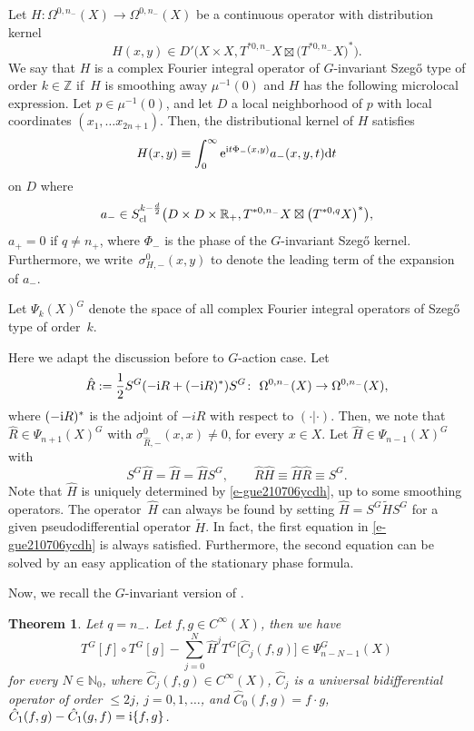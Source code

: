 \documentclass[10pt,a4paper]{amsart}
\numberwithin{equation}{section}
\newtheorem{Theorem}{Theorem}[section]
\newcommand{\To}{\rightarrow}
\begin{document}
 \begin{Definition}\label{d-gue210803yyd}
 	Let $H\colon \Omega^{0,n_-}(X)\To\Omega^{0,n_-}(X)$ be a continuous operator with distribution kernel \[H(x,y)\in{D}'\bigl(X\times X,T^{*0,n_-}X\boxtimes\bigl(T^{*0,n_-}X\bigr)^*\bigr) .\]
 	We say that $H$ is a complex Fourier integral operator of $G$-invariant Szeg\H{o} type of order ${k\in\mathbb Z}$ if~$H$ is smoothing away $\mu^{-1}(0)$ and $H$ has the following microlocal expression. Let $p\in \mu^{-1}(0)$, and let $D$ a local neighborhood of $p$ with local coordinates $(x_1,\dots x_{2n+1})$. Then, the distributional kernel of $H$ satisfies
 	\[H(x,y)\equiv \int^\infty_0 {\rm e}^{{\rm i} t \Phi_-(x,y)}a_-(x, y, t) {\rm d}t\]
 	on $D$ where \[a_-\in S^{k-\frac{d}{2}}_{{\rm cl }}\bigl(D\times D\times\mathbb{R}_+,T^{*0,n_-}X\boxtimes\bigl(T^{*0,q}X\bigr)^*\bigr) ,\] $a_+=0$ if $q\neq n_+$, where $\Phi_-$ is the phase of the $G$-invariant Szeg\H{o} kernel. Furthermore, we write~${\sigma^0_{H,-}(x,y)}$ to denote the leading term of the expansion of $a_{-}$.
 	
 	Let $\Psi_k(X)^G$ denote the space of all complex Fourier integral operators of Szeg\H{o} type of order~$k$.
 \end{Definition}

Here we adapt the discussion before \cite[Theorem 4.9]{gh} to $G$-action case. Let
\[%
	\hat R:=\frac{1}{2}S^{G}(-{\rm i}R+(-{\rm i}R)^*)S^{G}\colon\ \Omega^{0,n_-}(X)\To\Omega^{0,n_-}(X),
\]
where $(-{\rm i}R)^*$ is the adjoint of $-iR$ with respect to $( \cdot | \cdot )$.
Then, we note that $\hat R\in\Psi_{n+1}(X)^G$ with $\sigma^0_{\hat R,-}(x,x)\neq0$, for every $x\in X$.
Let $\hat H\in\Psi_{n-1}(X)^G$ with
\begin{equation}\label{e-gue210706ycdh}
		S^G\hat H=\hat H=\hat HS^G ,\qquad
		\hat R\hat H\equiv \hat H\hat R\equiv S^G .
\end{equation}
Note that $\hat H$ is uniquely determined by \eqref{e-gue210706ycdh}, up to some smoothing operators. The operator~$\hat H$ can always be found by setting $\hat H= S^G \tilde{H} S^G$ for a given pseudodifferential operator $\tilde{H}$. In fact, the first equation in \eqref{e-gue210706ycdh} is always satisfied. Furthermore, the second equation can be solved by an easy application of the stationary phase formula.

Now, we recall the $G$-invariant version of \cite[Theorem 4.9]{gh}.

\begin{Theorem}\label{t-gue210706ycdg}
	Let $q=n_-$.
	Let $f, g\in{C}^\infty(X)$, then we have
	\[
		T^G[f]\circ T^G[g]-\sum^N_{j=0}\hat H^j T^G\big[{\hat C_{j}(f,g)}\big]\in\Psi_{n-N-1}^G(X)
	\]
	for every $N\in\mathbb N_0$, where $\hat C_{j}(f,g)\in{C}^\infty(X)$, $\hat C_{j}$ is a universal bidifferential operator of order $\leq 2j$, $j=0,1,\dots$, and
$\hat C_{0}(f,g)=f\cdot g$, $
			\hat C_{1}(f,g)-\hat C_{1}(g,f)= {\rm i} \{f,g\}$.
\end{Theorem}
\end{document}
